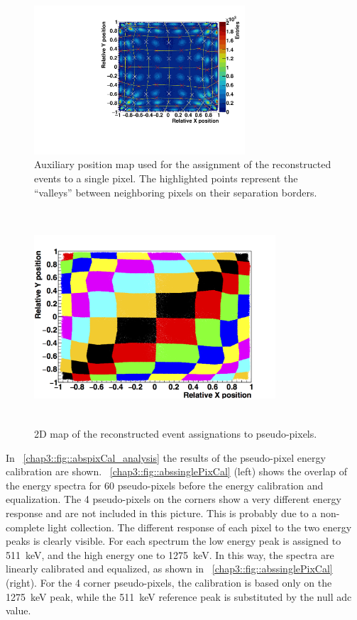 \begin{figure} [!h]
\centering
\includegraphics[width=0.7\textwidth]{03_GraphicFiles/chapter3_CLaRySproto/Absorber/images_charResults_Co60/3_Cal_FLOODMAP_averPoints.pdf}
\caption{Auxiliary position map used for the assignment of the reconstructed events to a single pixel. The highlighted points represent the \enquote{valleys} between neighboring pixels on their separation borders.}
\label{chap3::fig::absavPosMap}
\end{figure}

\begin{figure}
\centering
\includegraphics[width=9cm, height= 8cm]{03_GraphicFiles/chapter3_CLaRySproto/Absorber/images_charResults_Na22/3_2PixelAssignment.png}
\caption{2D map of the reconstructed event assignations to pseudo-pixels.}
\label{chap3::fig::abspixAssCheck}
\end{figure}

In \figurename~\ref{chap3::fig::abspixCal_analysis} the results of the pseudo-pixel energy calibration are shown. \figurename~\ref{chap3::fig::abssinglePixCal} (left) shows the overlap of the energy spectra for 60 pseudo-pixels before the energy calibration and equalization. The 4 pseudo-pixels on the corners show a very different energy response and are not included in this picture. This is probably due to a non-complete light collection. The different response of each pixel to the two energy peaks is clearly visible. For each spectrum the low energy peak is assigned to 511~keV, and the high energy one to 1275~keV. In this way, the spectra are linearly calibrated and equalized, as shown in \figurename~\ref{chap3::fig::abssinglePixCal} (right). For the 4 corner pseudo-pixels, the calibration is based only on the 1275~keV peak, while the 511~keV reference peak is substituted by the null \gls{adc} value.

